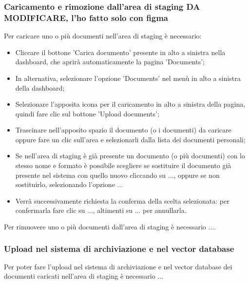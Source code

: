 \documentclass[10pt, a4paper]{article}
\begin{document}
\subsubsection{Caricamento e rimozione dall'area di staging DA MODIFICARE, l'ho fatto solo con figma}
Per caricare uno o più documenti nell'area di staging è necessario:
\begin{itemize}
    \item Cliccare il bottone 'Carica documento' presente in alto a sinistra nella dashboard, che aprirà automaticamente la pagina 'Documents';
    \item In alternativa, selezionare l'opzione 'Documents' nel menù in alto a sinistra della dashboard;
    \item Selezionare l'apposita icona per il caricamento in alto a sinistra della pagina, quindi fare clic sul bottone 'Upload documents';
    \item Trascinare nell'apposito spazio il documento (o i documenti) da caricare oppure fare un clic sull'area e selezionarli dalla lista dei documenti personali;
    \item Se nell'area di staging è già presente un documento (o più documenti) con lo stesso nome e formato è possibile scegliere se sostituire il documento già presente nel sistema con quello nuovo cliccando su ..., oppure se non sostituirlo, selezionando l'opzione ... 
    \item  Verrà successivamente richiesta la conferma della scelta selezionata: per confermarla fare clic su ..., altimenti su ... per annullarla.
    \end{itemize} 
Per rimuovere uno o più documenti dall'area di staging è necessario ....


\subsubsection{Upload nel sistema di archiviazione e nel vector database}
Per poter fare l’upload nel sistema di archiviazione e nel vector database dei documenti caricati nell’area di staging è necessario ...
\end{document}
